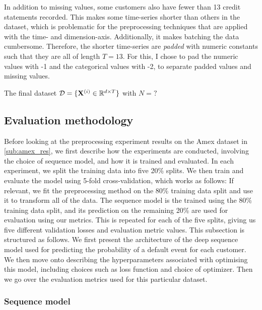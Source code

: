 \documentclass{statsmsc}
\begin{document}
{In addition to missing values, some customers also have fewer than 13 credit
statements recorded. This makes some time-series shorter than others in the
dataset, which is problematic for the preprocessing techniques that are applied
with the time- and dimension-axis.  Additionally, it makes batching the data
cumbersome. Therefore, the shorter time-series are \textit{padded} with numeric
constants such that they are all of length $T=13$. For this, I chose to pad the
numeric values with -1 and the categorical values with -2, to separate padded
values and missing values.


The final dataset $\mathcal{D}=\{ \mathbf{X}^{(i)} \in \mathbb{R}^{d \times T}\}$ with $N=?$


\subsection{Evaluation methodology}%
\label{sec:amex_meth}

Before looking at the preprocessing experiment results on the Amex dataset in \cref{sub:amex_res},
we first describe how the experiments are conducted, involving the choice of sequence model,
and how it is trained and evaluated. In each experiment, we split the training data into five
20\% splits. We then train and evaluate the model using 5-fold cross-validation, which works
as follows: If relevant, we fit the preprocessing method on the 80\% training data split and use
it to transform all of the data. The sequence model is the trained using the 80\% training data
split, and its prediction on the remaining 20\% are used for evaluation using our metrics.
This is repeated for each of the five splits, giving us five different validation losses and
evaluation metric values.
This subsection is structured as follows.
We first present the architecture of the deep sequence model used for predicting the probability of
a default event for each customer. We then move onto describing the hyperparameters associated with
optimising this model, including choices such as loss function and choice of optimizer. Then we
go over the evaluation metrics used for this particular dataset.


\subsubsection{Sequence model}%
\label{ssub:Sequence model}

}
\end{document}
